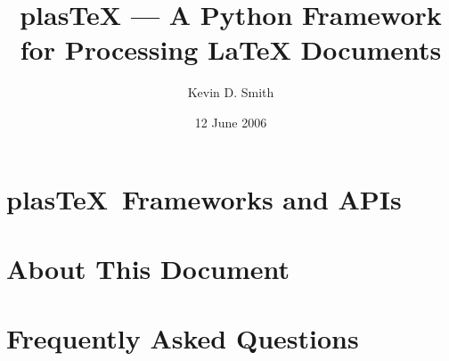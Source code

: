 \documentclass{manual}
\title{plasTeX --- A Python Framework for Processing LaTeX Documents}
\author{Kevin D. Smith}
\date{12 June 2006}
\newcommand{\plasTeX}{plas\TeX}
\begin{document}
\maketitle
\cleardoublepage
\tableofcontents












\chapter{\plasTeX\ Frameworks and APIs}









\appendix

\chapter{About This Document}



\chapter{Frequently Asked Questions}




\end{document}
